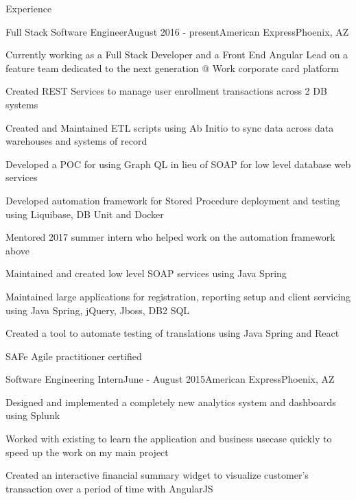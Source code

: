 \documentclass{resume} %
\begin{document}
\begin{rSection}{Experience}

\begin{rSubsection}{Full Stack Software Engineer}{August 2016 - present}{American Express}{Phoenix, AZ}

\item Currently working as a Full Stack Developer and a Front End Angular Lead on a feature team dedicated to the next generation @ Work corporate card platform\\

\item Created REST Services to manage user enrollment transactions across 2 DB systems
\item Created and Maintained ETL scripts using Ab Initio to sync data across data warehouses and systems of record
\item Developed a POC for using Graph QL in lieu of SOAP for low level database web services
\item Developed automation framework for Stored Procedure deployment and testing using Liquibase, DB Unit and Docker
\item Mentored 2017 summer intern who helped work on the automation framework above
\item Maintained and created low level SOAP services using Java Spring
\item Maintained large applications for registration, reporting setup and client servicing using Java Spring, jQuery, Jboss, DB2 SQL

\item Created a tool to automate testing of translations using Java Spring and React
\item SAFe Agile practitioner certified
\end{rSubsection}

\begin{rSubsection}{Software Engineering Intern}{June - August 2015}{American Express}{Phoenix, AZ}
\item Designed and implemented a completely new analytics system and dashboards using Splunk 
\item Worked with existing to learn the application and business usecase quickly to speed up the work on my main project
\item Created an interactive financial summary widget  to visualize customer's transaction over a period of time with AngularJS

\end{rSubsection}

\end{rSection}
\end{document}
